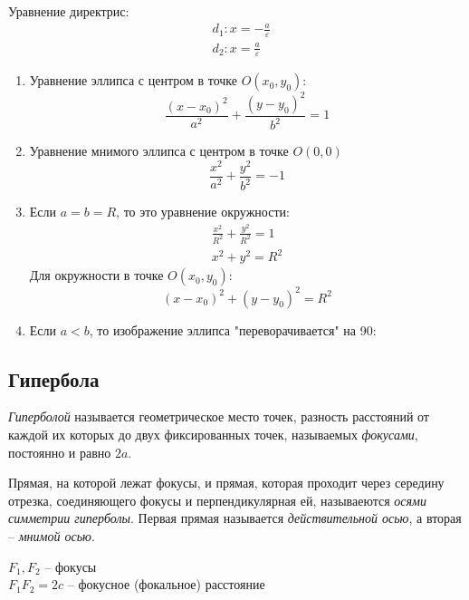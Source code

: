 Уравнение директрис:
\begin{align*}
  &d_1: x = -\frac{a}{\varepsilon} \\
  &d_2: x = \frac{a}{\varepsilon}
\end{align*}

\begin{note}
  \begin{center}
    \begin{enumerate}
      \item Уравнение эллипса с центром в точке $O(x_0, y_0)$: \[
        \frac{(x - x_0)^2}{a^2} + \frac{(y - y_0)^2}{b^2} = 1
        \]

      \item Уравнение мнимого эллипса с центром в точке $O(0, 0)$ \[
        \frac{x^2}{a^2} + \frac{y^2}{b^2} = -1
      \]  

      \item Если $a = b = R$, то это уравнение окружности:
        \begin{gather*}
          \frac{x^2}{R^2} + \frac{y^2}{R^2} = 1 \\
          x^2 + y^2 = R^2
        \end{gather*}
        Для окружности в точке $O(x_0, y_0)$: \[
          (x - x_0)^2 + (y - y_0)^2 = R^2
        \]

      \item Если $a < b$, то изображение эллипса "переворачивается" на 90:
  \end{enumerate} 
  \end{center}
\end{note}

\subsection{Гипербола}

\begin{definition}
  \textit{Гиперболой} называется геометрическое место точек, разность расстояний от каждой их которых до двух фиксированных точек, называемых \textit{фокусами}, постоянно и равно $2a$.
\end{definition}

Прямая, на которой лежат фокусы, и прямая, которая проходит через середину отрезка, соединяющего фокусы и перпендикулярная ей, называеются \textit{осями симметрии гиперболы}. 
Первая прямая называется \textit{действительной осью}, а вторая -- \textit{мнимой осью}.

$F_1, F_2$ -- фокусы \\
$F_1F_2 = 2c$ -- фокусное (фокальное) расстояние

